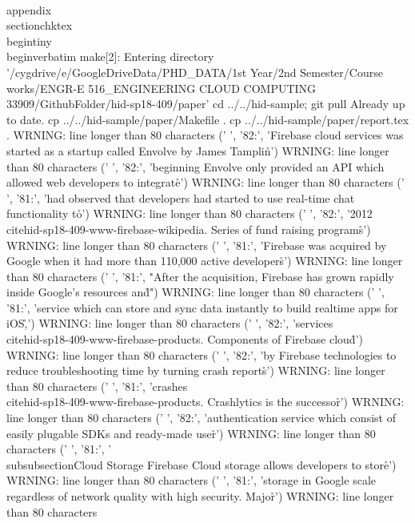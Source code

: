 \\appendix
\\section{chktex}
\\begin{tiny}
\\begin{verbatim}
make[2]: Entering directory '/cygdrive/e/GoogleDriveData/PHD_DATA/1st Year/2nd Semester/Course works/ENGR-E 516_ENGINEERING CLOUD COMPUTING 33909/GithubFolder/hid-sp18-409/paper'
cd ../../hid-sample; git pull
Already up to date.
cp ../../hid-sample/paper/Makefile .
cp ../../hid-sample/paper/report.tex .
WRNING: line longer than 80 characters
('      ', '82:', 'Firebase cloud services was started as a startup called Envolve by James Tamplin\r\n')
WRNING: line longer than 80 characters
('      ', '82:', 'beginning Envolve only provided an API which allowed web developers to integrate\r\n')
WRNING: line longer than 80 characters
('      ', '81:', 'had observed that developers had started to use real-time chat functionality to\r\n')
WRNING: line longer than 80 characters
('      ', '82:', '2012~\\cite{hid-sp18-409-www-firebase-wikipedia}. Series of fund raising programs\r\n')
WRNING: line longer than 80 characters
('      ', '81:', 'Firebase was acquired by Google when it had more than 110,000 active developers\r\n')
WRNING: line longer than 80 characters
('      ', '81:', "After the acquisition, Firebase has grown rapidly inside Google's resources and\r\n")
WRNING: line longer than 80 characters
('      ', '81:', 'service which can store and sync data instantly to build realtime apps for iOS,\r\n')
WRNING: line longer than 80 characters
('      ', '82:', 'services~\\cite{hid-sp18-409-www-firebase-products}. Components of Firebase cloud\r\n')
WRNING: line longer than 80 characters
('      ', '82:', 'by Firebase technologies to reduce troubleshooting time by turning crash reports\r\n')
WRNING: line longer than 80 characters
('      ', '81:', 'crashes~\\cite{hid-sp18-409-www-firebase-products}. Crashlytics is the successor\r\n')
WRNING: line longer than 80 characters
('      ', '82:', 'authentication service which consist of easily plugable SDKs and ready-made user\r\n')
WRNING: line longer than 80 characters
('      ', '81:', '\\subsubsection{Cloud Storage} Firebase Cloud storage allows developers to store\r\n')
WRNING: line longer than 80 characters
('      ', '81:', 'storage in Google scale regardless of network quality with high security. Major\r\n')
WRNING: line longer than 80 characters

